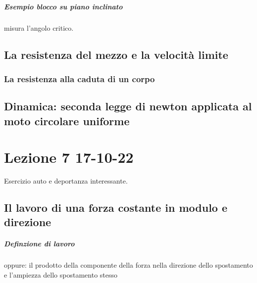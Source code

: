 \documentclass[12pt, a4paper, openany]{book}
\begin{document}
\paragraph*{Esempio blocco su piano inclinato} misura l'angolo critico.

\section*{La resistenza del mezzo e la velocità limite}
\subsection*{La resistenza alla caduta di un corpo}

\section*{Dinamica: seconda legge di newton applicata al moto circolare uniforme}

\chapter*{Lezione 7 17-10-22}
Esercizio auto e deportanza interessante.
\section*{Il lavoro di una forza costante in modulo e direzione}
\paragraph*{Definzione di lavoro}
oppure: il prodotto della componente della forza nella direzione dello spostamento e l'ampiezza dello spostamento stesso
\end{document}
